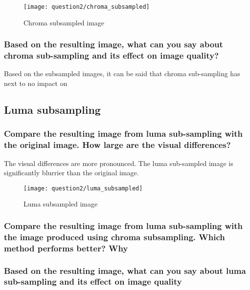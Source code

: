 \begin{figure}[ht]
\centering	
	\texttt{[image: question2/chroma\_subsampled]}
	\caption{Chroma subsampled image}
\end{figure}

\subsubsection{Based on the resulting image, what can you say about chroma sub-sampling and its effect on image
quality?}
Based on the subsampled images, it can be said that chroma sub-sampling has next to no impact on 

\clearpage
\subsection{Luma subsampling}
\subsubsection{Compare the resulting image from luma sub-sampling with the original image. How large are the
visual differences?}
The visual differences are more pronounced. The luma sub-sampled image is significantly blurrier than the original image.



\begin{figure}[ht]
\centering		
	\texttt{[image: question2/luma\_subsampled]}
	\caption{Luma subsampled image}
\end{figure}

\subsubsection{ Compare the resulting image from luma sub-sampling with the image produced using chroma subsampling. Which method performs better? Why}

\subsubsection{Based on the resulting image, what can you say about luma sub-sampling and its effect on image
quality}